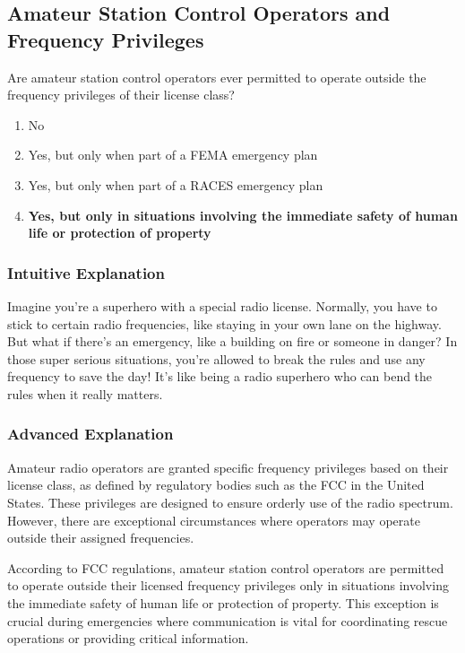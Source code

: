 \subsection{Amateur Station Control Operators and Frequency Privileges}
\label{T2C09}

\begin{tcolorbox}[colback=gray!10!white,colframe=black!75!black,title=T2C09]
Are amateur station control operators ever permitted to operate outside the frequency privileges of their license class?
\begin{enumerate}[label=\Alph*]
    \item No
    \item Yes, but only when part of a FEMA emergency plan
    \item Yes, but only when part of a RACES emergency plan
    \item \textbf{Yes, but only in situations involving the immediate safety of human life or protection of property}
\end{enumerate}
\end{tcolorbox}

\subsubsection{Intuitive Explanation}
Imagine you're a superhero with a special radio license. Normally, you have to stick to certain radio frequencies, like staying in your own lane on the highway. But what if there's an emergency, like a building on fire or someone in danger? In those super serious situations, you're allowed to break the rules and use any frequency to save the day! It's like being a radio superhero who can bend the rules when it really matters.

\subsubsection{Advanced Explanation}
Amateur radio operators are granted specific frequency privileges based on their license class, as defined by regulatory bodies such as the FCC in the United States. These privileges are designed to ensure orderly use of the radio spectrum. However, there are exceptional circumstances where operators may operate outside their assigned frequencies. 

According to FCC regulations, amateur station control operators are permitted to operate outside their licensed frequency privileges only in situations involving the immediate safety of human life or protection of property. This exception is crucial during emergencies where communication is vital for coordinating rescue operations or providing critical information. 

